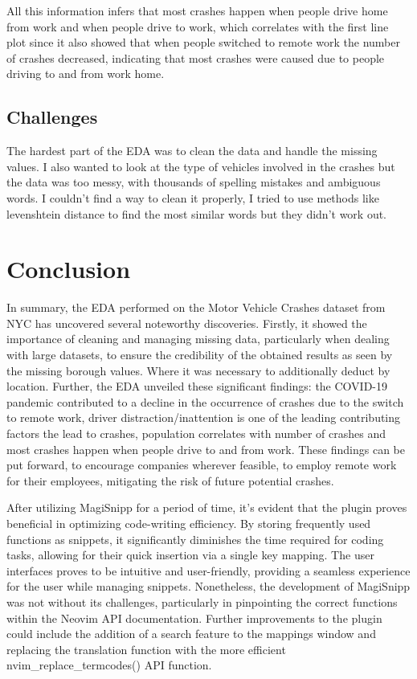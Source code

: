 \documentclass[runningheads]{llncs}
\begin{document}
All this information infers that most crashes happen when people drive home from work and when people drive to work,
which correlates with the first line plot since it also showed that when people switched to remote work the number of crashes decreased,
indicating that most crashes were caused due to people driving to and from work home.

\subsection{Challenges}

The hardest part of the EDA was to clean the data and handle the missing values. 
I also wanted to look at the type of vehicles involved in the crashes but the data was too messy, with thousands of spelling mistakes and ambiguous words.
I couldn't find a way to clean it properly, I tried to use methods like levenshtein distance to find the most similar words but they didn't work out.

\section{Conclusion}

In summary, the EDA performed on the Motor Vehicle Crashes dataset from NYC has uncovered several noteworthy discoveries. 
Firstly, it showed the importance of cleaning and managing missing data, particularly when dealing with large datasets, 
to ensure the credibility of the obtained results as seen by the missing borough values. Where it was necessary to additionally deduct by location. 
Further, the EDA unveiled these significant findings: the COVID-19 pandemic contributed to a decline in the occurrence of crashes due to the switch to remote work,
driver distraction/inattention is one of the leading contributing factors the lead to crashes, population correlates with number of crashes 
and most crashes happen when people drive to and from work. These findings can be put forward, to encourage companies wherever feasible, to employ remote work for their employees, 
mitigating the risk of future potential crashes.

After utilizing MagiSnipp for a period of time, it's evident that the plugin proves 
beneficial in optimizing code-writing efficiency. By storing frequently used functions as snippets, 
it significantly diminishes the time required for coding tasks, allowing for their quick insertion via a single key mapping.
The user interfaces proves to be intuitive and user-friendly, providing a seamless experience for the user while managing snippets.
Nonetheless, the development of MagiSnipp was not without its challenges, particularly in pinpointing the correct functions within the Neovim API documentation.
Further improvements to the plugin could include the addition of a search feature to the mappings window and replacing the translation function with 
the more efficient nvim\_replace\_termcodes() API function.
\end{document}
